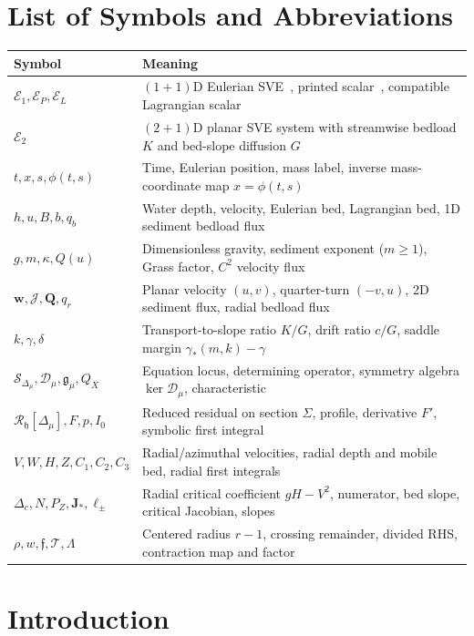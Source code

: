 \documentclass[12pt,a4paper,oneside]{report}
\numberwithin{equation}{chapter}
\theoremstyle{definition}
\theoremstyle{remark}\newtheorem{remark}[theorem]{Remark}
\renewcommand{\arraystretch}{1.22}
\begin{document}
\chapter*{List of Symbols and Abbreviations}
{\footnotesize
\renewcommand{\arraystretch}{1.14}
\begin{tabularx}{\linewidth}{@{}p{.30\linewidth}X@{}}
\toprule
Symbol & Meaning\\\midrule
$\mathcal E_1,\mathcal E_P,\mathcal E_L$ & $(1+1)$D Eulerian SVE~\cite{sve2022}, printed scalar~\cite{sve2026}, compatible Lagrangian scalar\\
$\mathcal E_2$ & $(2+1)$D planar SVE system with streamwise bedload $K$ and bed-slope diffusion $G$\\
$t,x,s,\phi(t,s)$ & Time, Eulerian position, mass label, inverse mass-coordinate map $x=\phi(t,s)$\\
$h,u,B,b,q_b$ & Water depth, velocity, Eulerian bed, Lagrangian bed, 1D sediment bedload flux\\
$g,m,\kappa,Q(u)$ & Dimensionless gravity, sediment exponent ($m\ge1$), Grass factor, $C^2$ velocity flux\\
$\mathbf w,\mathcal J,\mathbf Q,q_r$ & Planar velocity $(u,v)$, quarter-turn $(-v,u)$, 2D sediment flux, radial bedload flux\\
$k,\gamma,\delta$ & Transport-to-slope ratio $K/G$, drift ratio $c/G$, saddle margin $\gamma_*(m,k)-\gamma$\\
$\mathcal S_{\Delta_\mu},\mathscr D_\mu,\mathfrak g_\mu,Q_X$ & Equation locus, determining operator, symmetry algebra $\ker\mathscr D_\mu$, characteristic\\
$\mathcal R_{\mathfrak h}[\Delta_\mu],F,p,I_0$ & Reduced residual on section $\Sigma$, profile, derivative $F'$, symbolic first integral\\
$V,W,H,Z,C_1,C_2,C_3$ & Radial/azimuthal velocities, radial depth and mobile bed, radial first integrals\\
$\Delta_c,N,P_Z,\mathbf J_*,\ell_\pm$ & Radial critical coefficient $gH-V^2$, numerator, bed slope, critical Jacobian, slopes\\
$\rho,w,\mathfrak f,\mathcal T,\Lambda$ & Centered radius $r-1$, crossing remainder, divided RHS, contraction map and factor\\\bottomrule
\end{tabularx}}
\clearpage
{}

\chapter{Introduction}\label{ch:introduction}
\end{document}
